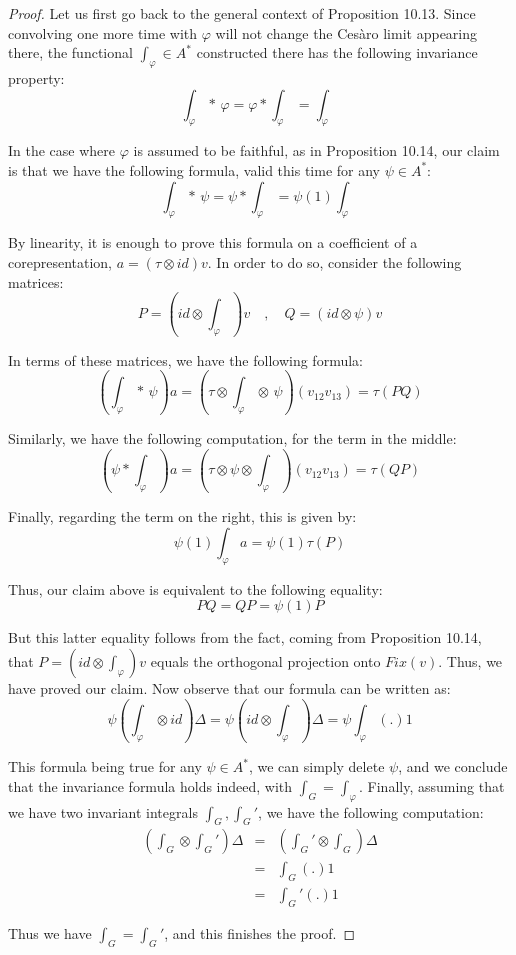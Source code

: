 \documentclass[12pt]{amsbook}
\begin{document}
\begin{proof}
Let us first go back to the general context of Proposition 10.13. Since convolving one more time with $\varphi$ will not change the Ces\`aro limit appearing there, the functional $\int_\varphi\in A^*$ constructed there has the following invariance property:
$$\int_\varphi*\,\varphi=\varphi*\int_\varphi=\int_\varphi$$

In the case where $\varphi$ is assumed to be faithful, as in Proposition 10.14, our claim is that we have the following formula, valid this time for any $\psi\in A^*$:
$$\int_\varphi*\,\psi=\psi*\int_\varphi=\psi(1)\int_\varphi$$

By linearity, it is enough to prove this formula on a coefficient of a corepresentation, $a=(\tau\otimes id)v$. In order to do so, consider the following matrices:
$$P=\left(id\otimes\int_\varphi\right)v\quad,\quad 
Q=(id\otimes\psi)v$$

In terms of these matrices, we have the following formula:
$$\left(\int_\varphi*\,\psi\right)a
=\left(\tau\otimes\int_\varphi\otimes\,\psi\right)(v_{12}v_{13})
=\tau(PQ)$$

Similarly, we have the following computation, for the term in the middle:
$$\left(\psi*\int_\varphi\right)a
=\left(\tau\otimes\psi\otimes\int_\varphi\right)(v_{12}v_{13})
=\tau(QP)$$

Finally, regarding the term on the right, this is given by:
$$\psi(1)\int_\varphi a=\psi(1)\tau(P)$$

Thus, our claim above is equivalent to the following equality:
$$PQ=QP=\psi(1)P$$

But this latter equality follows from the fact, coming from Proposition 10.14, that $P=(id\otimes\int_\varphi)v$ equals the orthogonal projection onto $Fix(v)$. Thus, we have proved our claim. Now observe that our formula can be written as:
$$\psi\left(\int_\varphi\otimes id\right)\Delta=\psi\left(id\otimes\int_\varphi\right)\Delta=\psi\int_\varphi(.)1$$

This formula being true for any $\psi\in A^*$, we can simply delete $\psi$, and we conclude that the invariance formula holds indeed, with $\int_G=\int_\varphi$. Finally, assuming that we have two invariant integrals $\int_G,\int_G'$, we have the following computation:
\begin{eqnarray*}
\left(\int_G\otimes\int_G'\right)\Delta
&=&\left(\int_G'\otimes\int_G\right)\Delta\\
&=&\int_G(.)1\\
&=&\int_G'(.)1
\end{eqnarray*}

Thus we have $\int_G=\int_G'$, and this finishes the proof.
\end{proof}
\end{document}
